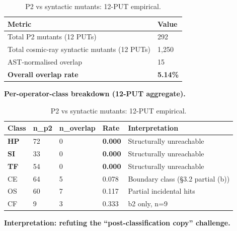 \documentclass[review,12pt,authoryear]{elsarticle}
\begin{document}
{\def\LTcaptype{table} %
\begin{longtable}[]{@{}ll@{}}
\caption{P2 vs syntactic mutants: 12-PUT empirical.}\label{tab:p2-04}\\
\toprule\noalign{}
Metric & Value \\
\midrule\noalign{}
\endhead
\bottomrule\noalign{}
\endlastfoot
Total P2 mutants (12 PUTs) & 292 \\
Total cosmic-ray syntactic mutants (12 PUTs) & 1,250 \\
AST-normalised overlap & 15 \\
\textbf{Overall overlap rate} & \textbf{5.14\%} \\
\end{longtable}
}

\textbf{Per-operator-class breakdown (12-PUT aggregate).}

{\def\LTcaptype{table} %
\begin{longtable}[]{@{}lllll@{}}
\caption{P2 vs syntactic mutants: 12-PUT empirical.}\label{tab:p2-05}\\
\toprule\noalign{}
Class & n\_p2 & n\_overlap & Rate & Interpretation \\
\midrule\noalign{}
\endhead
\bottomrule\noalign{}
\endlastfoot
\textbf{HP} & 72 & 0 & \textbf{0.000} & Structurally unreachable \\
\textbf{SI} & 33 & 0 & \textbf{0.000} & Structurally unreachable \\
\textbf{TF} & 54 & 0 & \textbf{0.000} & Structurally unreachable \\
CE & 64 & 5 & 0.078 & Boundary class (§3.2 partial (b)) \\
OS & 60 & 7 & 0.117 & Partial incidental hits \\
CF & 9 & 3 & 0.333 & b2 only, n=9 \\
\end{longtable}
}

\textbf{Interpretation: refuting the ``post-classification copy''
challenge.}
\end{document}
